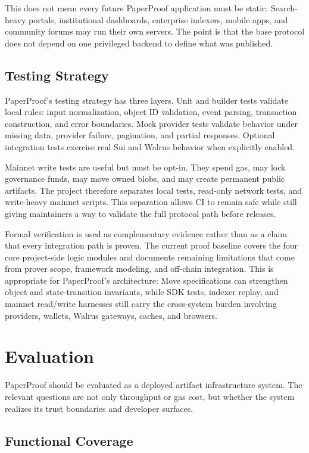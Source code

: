 \documentclass[journal]{IEEEtran}
\begin{document}
This does not mean every future PaperProof application must be static. Search-heavy portals, institutional dashboards, enterprise indexers, mobile apps, and community forums may run their own servers. The point is that the base protocol does not depend on one privileged backend to define what was published.

\subsection{Testing Strategy}

PaperProof's testing strategy has three layers. Unit and builder tests validate local rules: input normalization, object ID validation, event parsing, transaction construction, and error boundaries. Mock provider tests validate behavior under missing data, provider failure, pagination, and partial responses. Optional integration tests exercise real Sui and Walrus behavior when explicitly enabled.

Mainnet write tests are useful but must be opt-in. They spend gas, may lock governance funds, may move owned blobs, and may create permanent public artifacts. The project therefore separates local tests, read-only network tests, and write-heavy mainnet scripts. This separation allows CI to remain safe while still giving maintainers a way to validate the full protocol path before releases.

Formal verification is used as complementary evidence rather than as a claim
that every integration path is proven. The current proof baseline covers the
four core project-side logic modules and documents remaining limitations that
come from prover scope, framework modeling, and off-chain integration. This is
appropriate for PaperProof's architecture: Move specifications can strengthen
object and state-transition invariants, while SDK tests, indexer replay, and
mainnet read/write harnesses still carry the cross-system burden involving
providers, wallets, Walrus gateways, caches, and browsers.

\section{Evaluation}

PaperProof should be evaluated as a deployed artifact infrastructure system. The relevant questions are not only throughput or gas cost, but whether the system realizes its trust boundaries and developer surfaces.

\subsection{Functional Coverage}
\end{document}
